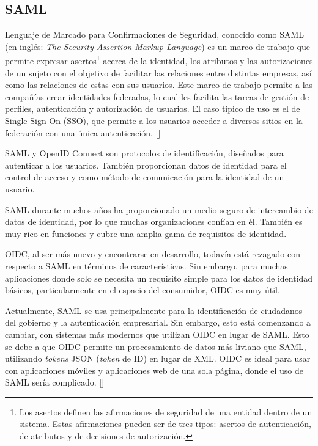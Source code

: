 \subsection{SAML}
Lenguaje de Marcado para Confirmaciones de Seguridad, conocido como SAML (en inglés: \textit{The Security Assertion Markup Language}) es un marco de trabajo que permite expresar asertos\footnote{ Los asertos definen las afirmaciones de seguridad de una entidad dentro de un sistema. Estas afirmaciones pueden ser de tres tipos: asertos de autenticación, de atributos y de decisiones de autorización.} acerca de la identidad, los atributos y las autorizaciones de un sujeto con el objetivo de facilitar las relaciones entre distintas empresas, así como las relaciones de estas con sus usuarios. Este marco de trabajo permite a las compañías crear identidades federadas, lo cual les facilita las tareas de gestión de perfiles, autenticación y autorización de usuarios. El caso típico de uso es el de Single Sign-On (SSO), que permite a los usuarios acceder a diversos sitios en la federación con una única autenticación. [\cite{sanchez2009estudio}]

SAML y OpenID Connect son protocolos de identificación, diseñados para autenticar a los usuarios. También proporcionan datos de identidad para el control de acceso y como método de comunicación para la identidad de un usuario.

SAML durante muchos años ha proporcionado un medio seguro de intercambio de datos de identidad, por lo que muchas organizaciones confían en él. También es muy rico en funciones y cubre una amplia gama de requisitos de identidad.


OIDC, al ser más nuevo y encontrarse en desarrollo, todavía está rezagado con respecto a SAML en términos de características. Sin embargo, para muchas aplicaciones donde solo se necesita un requisito simple para los datos de identidad básicos, particularmente en el espacio del consumidor, OIDC es muy útil.

Actualmente, SAML se usa principalmente para la identificación de ciudadanos del gobierno y la autenticación empresarial. Sin embargo, esto está comenzando a cambiar, con sistemas más modernos que utilizan OIDC en lugar de SAML. Esto se debe a que OIDC permite un procesamiento de datos más liviano que SAML, utilizando \textit{tokens} JSON (\textit{token} de ID) en lugar de XML. OIDC es ideal para usar con aplicaciones móviles y aplicaciones web de una sola página, donde el uso de SAML sería complicado. [\cite{naik2017securing}]


